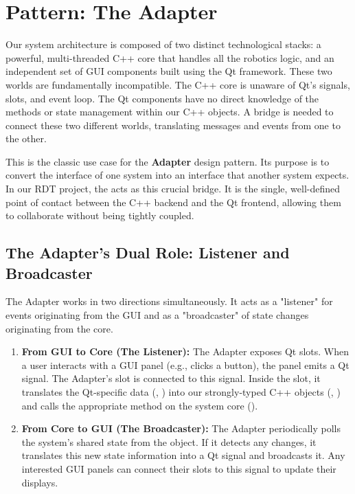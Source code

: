 \section{Pattern: The Adapter}
\label{sec:pattern_adapter_conceptual}

Our system architecture is composed of two distinct technological stacks: a powerful, multi-threaded C++ core that handles all the robotics logic, and an independent set of GUI components built using the Qt framework. These two worlds are fundamentally incompatible. The C++ core is unaware of Qt's signals, slots, and event loop. The Qt components have no direct knowledge of the methods or state management within our C++ objects. A bridge is needed to connect these two different worlds, translating messages and events from one to the other.

This is the classic use case for the \textbf{Adapter} design pattern. Its purpose is to convert the interface of one system into an interface that another system expects. In our RDT project, the \textbf{} acts as this crucial bridge. It is the single, well-defined point of contact between the C++ backend and the Qt frontend, allowing them to collaborate without being tightly coupled.

\subsection{The Adapter's Dual Role: Listener and Broadcaster}
\label{subsec:adapter_dual_role_conceptual}

The Adapter works in two directions simultaneously. It acts as a "listener" for events originating from the GUI and as a "broadcaster" of state changes originating from the core.

\begin{enumerate}
    \item \textbf{From GUI to Core (The Listener):} The Adapter exposes Qt slots. When a user interacts with a GUI panel (e.g., clicks a button), the panel emits a Qt signal. The Adapter's slot is connected to this signal. Inside the slot, it translates the Qt-specific data (, ) into our strongly-typed C++ objects (, ) and calls the appropriate method on the system core ().
    
    \item \textbf{From Core to GUI (The Broadcaster):} The Adapter periodically polls the system's shared state from the  object. If it detects any changes, it translates this new state information into a Qt signal and broadcasts it. Any interested GUI panels can connect their slots to this signal to update their displays.
\end{enumerate}

